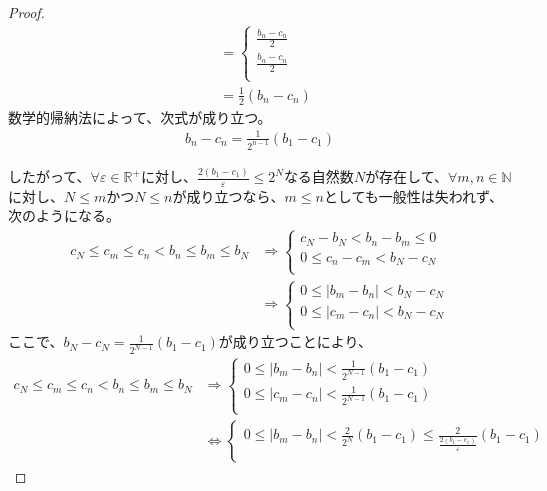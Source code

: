 \documentclass[dvipdfmx]{jsarticle}
\begin{document}
\begin{proof}
\begin{align*}
&= \left\{ \begin{matrix}
\frac{b_{n} - c_{n}}{2} \\
\frac{b_{n} - c_{n}}{2} \\
\end{matrix} \right.\ \\
&= \frac{1}{2}\left( b_{n} - c_{n} \right)
\end{align*}
数学的帰納法によって、次式が成り立つ。
\begin{align*}
b_{n} - c_{n} = \frac{1}{2^{n - 1}}\left( b_{1} - c_{1} \right)
\end{align*}\par
したがって、$\forall\varepsilon \in \mathbb{R}^{+}$に対し、$\frac{2\left( b_{1} - c_{1} \right)}{\varepsilon} \leq 2^{N}$なる自然数$N$が存在して、$\forall m,n \in \mathbb{N}$に対し、$N \leq m$かつ$N \leq n$が成り立つなら、$m \leq n$としても一般性は失われず、次のようになる。
\begin{align*}
c_{N} \leq c_{m} \leq c_{n} < b_{n} \leq b_{m} \leq b_{N} &\Rightarrow \left\{ \begin{matrix}
c_{N} - b_{N} < b_{n} - b_{m} \leq 0 \\
0 \leq c_{n} - c_{m} < b_{N} - c_{N} \\
\end{matrix} \right.\ \\
&\Rightarrow \left\{ \begin{matrix}
0 \leq \left| b_{m} - b_{n} \right| < b_{N} - c_{N} \\
0 \leq \left| c_{m} - c_{n} \right| < b_{N} - c_{N} \\
\end{matrix} \right.
\end{align*}
ここで、$b_{N} - c_{N} = \frac{1}{2^{N - 1}}\left( b_{1} - c_{1} \right)$が成り立つことにより、
\begin{align*}
c_{N} \leq c_{m} \leq c_{n} < b_{n} \leq b_{m} \leq b_{N} &\Rightarrow \left\{ \begin{matrix}
0 \leq \left| b_{m} - b_{n} \right| < \frac{1}{2^{N - 1}}\left( b_{1} - c_{1} \right) \\
0 \leq \left| c_{m} - c_{n} \right| < \frac{1}{2^{N - 1}}\left( b_{1} - c_{1} \right) \\
\end{matrix} \right.\ \\
&\Leftrightarrow \left\{ \begin{matrix}
0 \leq \left| b_{m} - b_{n} \right| < \frac{2}{2^{N}}\left( b_{1} - c_{1} \right) \leq \frac{2}{\frac{2\left( b_{1} - c_{1} \right)}{\varepsilon}}\left( b_{1} - c_{1} \right) \\

\end{matrix}
\end{align*}
\end{proof}
\end{document}
